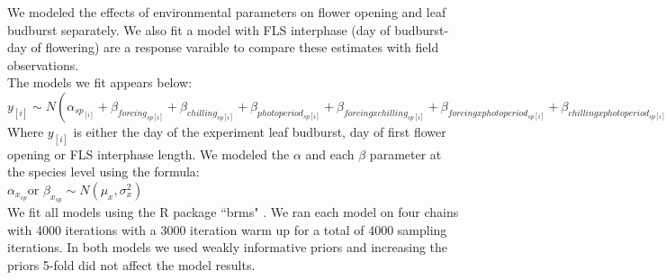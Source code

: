 \documentclass[11pt]{article}
\begin{document}


We modeled the effects of environmental parameters on flower opening and leaf budburst separately.
We also fit a model with FLS interphase (day of budburst- day of flowering) are a response varaible to compare these estimates with field observations.\\

The models we fit appears below:\\

$y_{[i]} \sim N(\alpha_{sp_{[i]}}+\beta_{forcing_{sp[i]}}+\beta_{chilling_{sp[i]}}+\beta_{photoperiod_{sp[i]}}+\beta_{forcing x chilling_{sp[i]}}+\beta_{forcing x photoperiod_{sp[i]}}+\beta_{chilling x photoperiod_{sp[i]}})$\\

Where $y_{[i]}$ is either the day of the experiment leaf budburst, day of first flower opening or FLS interphase length.  We modeled the $\alpha$ and each $\beta$ parameter at the species level using the formula:\\

$\alpha_{x_{sp}} $or $\beta_{x_{sp}} \sim N(\mu_x,\sigma^2_x)$\\

\noindent We fit all models using the R package ``brms" \citep{Burkner2018}. We ran each model on four chains with 4000 iterations with a 3000 iteration warm up for a total of 4000 sampling iterations. In both models we used weakly informative priors and increasing the priors 5-fold did not affect the model results.\\
\end{document}

